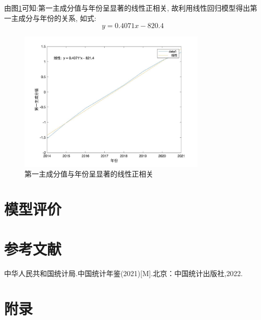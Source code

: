 \documentclass[12pt, a4paper, oneside]{ctexart}
\begin{document}
    由图\ref{fig:第一主成分值}可知:第一主成分值与年份呈显著的线性正相关, 故利用线性回归模型得出第一主成分与年份的关系, 如式:
    \begin{dmath}
        y=0.4071x-820.4
    \end{dmath}
    \begin{figure}[h]
        \centering
        \includegraphics[width=0.8\textwidth]{pic/第一主成分值.jpg}
        \caption{第一主成分值与年份呈显著的线性正相关}
        \label{fig:第一主成分值}
    \end{figure}


    \section{模型评价}

    \section{参考文献}
    \begin{thebibliography}{99}
        中华人民共和国统计局.中国统计年鉴(2021)[M].北京：中国统计出版社,2022.
    \end{thebibliography}
    \section{附录}
\end{document}
